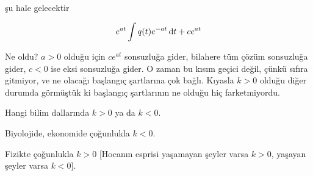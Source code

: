 \documentclass[12pt,fleqn]{article}\usepackage{../../common}
\begin{document}
şu hale gelecektir

$$ e^{at} \int q(t) e^{-at} \,\mathrm{d} t + ce^{at}$$

Ne oldu? $a>0$ olduğu için $ce^{at}$ sonsuzluğa gider, bilahere tüm çözüm
sonsuzluğa gider, $c < 0$ ise eksi sonsuzluğa gider. O zaman bu kısım
geçici değil, çünkü sıfıra gitmiyor, ve ne olacağı başlangıç şartlarına çok
bağlı. Kıyasla $k>0$ olduğu diğer durumda görmüştük ki başlangıç
şartlarının ne olduğu hiç farketmiyordu.

Hangi bilim dallarında $k > 0$ ya da $k < 0$. 

Biyolojide, ekonomide çoğunlukla $k < 0$. 

Fizikte çoğunlukla $k > 0$ [Hocanın esprisi yaşamayan şeyler varsa $k > 0$,
yaşayan şeyler varsa $k < 0$]. 
\end{document}
